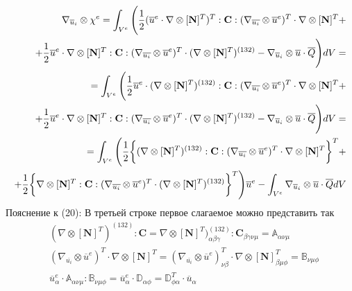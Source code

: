 \documentclass[a4paper,12pt]{article}
\begin{document}
\begin{equation}
    \begin{split}
        \nabla_{\overline{u}_i} \otimes \chi^e   =  \int_{V^e} \Bigg(\frac{1}{2} (\overline{u}^e \cdot \nabla \otimes[\textbf{N}]^T )^T :\textbf{C}: (\nabla_{\overline{u_i}} \otimes \overline{u}^e)^T \cdot \nabla \otimes [\textbf{N}]^T + \\
        + \frac{1}{2} \overline{u}^e \cdot \nabla \otimes [\textbf{N}]^T:\textbf{C}:(\nabla_{\overline{u_i}} \otimes \overline{u}^e)^T \cdot (\nabla \otimes [\textbf{N}]^T)^{(132)} - \nabla_{\overline{u}_i} \otimes\overline{u} \cdot \overline{Q}\Bigg) \space dV = \\ =
        \int_{V^e} \Bigg(\frac{1}{2} \overline{u}^e \cdot (\nabla \otimes[\textbf{N}]^T)^{(132)} :\textbf{C}: (\nabla_{\overline{u_i}} \otimes \overline{u}^e)^T \cdot \nabla \otimes [\textbf{N}]^T + \\
        + \frac{1}{2} \overline{u}^e \cdot \nabla \otimes [\textbf{N}]^T:\textbf{C}:(\nabla_{\overline{u_i}} \otimes \overline{u}^e)^T \cdot (\nabla \otimes [\textbf{N}]^T)^{(132)} - \nabla_{\overline{u}_i} \otimes\overline{u} \cdot \overline{Q}\Bigg) \space dV = \\ =
         \int_{V^e} \Bigg(\frac{1}{2} \bigg\{ (\nabla \otimes[\textbf{N}]^T)^{(132)} :\textbf{C}: (\nabla_{\overline{u_i}} \otimes \overline{u}^e)^T \cdot \nabla \otimes [\textbf{N}]^T \bigg\}^T+ \\
        + \frac{1}{2} \bigg\{ \nabla \otimes [\textbf{N}]^T:\textbf{C}:(\nabla_{\overline{u_i}} \otimes \overline{u}^e)^T \cdot (\nabla \otimes [\textbf{N}]^T)^{(132)} \bigg\}^T \Bigg) \overline{u}^e - \int_{V^e}\nabla_{\overline{u}_i} \otimes\overline{u} \cdot \overline{Q} \space dV 
    \end{split}
\end{equation}
Пояснение к (20):  В третьей строке первое слагаемое можно представить так 
\begin{equation}
    \begin{split}
    &(\nabla \otimes[\textbf{N}]^T)^{(132)} :\textbf{C} = \nabla \otimes[\textbf{N}]^T)^{(132)}_{\alpha \beta \gamma}: \textbf{C}_{\beta \gamma \nu \mu} = \mathbb{A}_{\alpha \nu \mu}  \\
    & (\nabla_{\overline{u_i}} \otimes \overline{u}^e)^T \cdot \nabla \otimes [\textbf{N}]^T = (\nabla_{\overline{u_i}} \otimes \overline{u}^e)^T_{\nu \beta} \cdot \nabla \otimes [\textbf{N}]^T_{\beta \mu \phi} = \mathbb{B}_{\nu \mu \phi} \\
    & \overline{u}^e_\alpha \cdot \mathbb{A}_{\alpha \nu \mu} : \mathbb{B}_{\nu \mu \phi} = \overline{u}^e_\alpha \cdot \mathbb{D}_{\alpha \phi} = \mathbb{D}_{\phi \alpha}^T \cdot \overline{u}_\alpha
    \end{split}
\end{equation}
\end{document}
